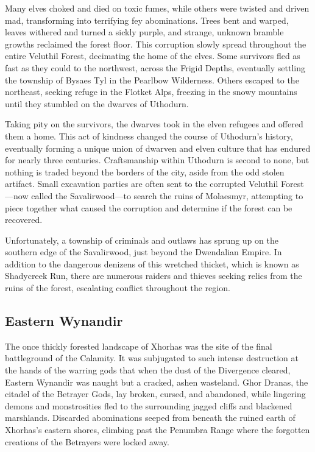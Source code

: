 \documentclass[10pt,a4paper,twoside,bg=print,twocolumn,openany,nodeprecatedcode]{dndbook}
\begin{document}
Many elves choked and died on toxic fumes, while others were twisted and driven mad, transforming into terrifying fey abominations. Trees bent and warped, leaves withered and turned a sickly purple, and strange, unknown bramble growths reclaimed the forest floor. This corruption slowly spread throughout the entire Veluthil Forest, decimating the home of the elves. Some survivors fled as fast as they could to the northwest, across the Frigid Depths, eventually settling the township of Bysaes Tyl in the Pearlbow Wilderness. Others escaped to the northeast, seeking refuge in the Flotket Alps, freezing in the snowy mountains until they stumbled on the dwarves of Uthodurn.

Taking pity on the survivors, the dwarves took in the elven refugees and offered them a home. This act of kindness changed the course of Uthodurn's history, eventually forming a unique union of dwarven and elven culture that has endured for nearly three centuries. Craftsmanship within Uthodurn is second to none, but nothing is traded beyond the borders of the city, aside from the odd stolen artifact. Small excavation parties are often sent to the corrupted Veluthil Forest—now called the Savalirwood—to search the ruins of Molaesmyr, attempting to piece together what caused the corruption and determine if the forest can be recovered.

Unfortunately, a township of criminals and outlaws has sprung up on the southern edge of the Savalirwood, just beyond the Dwendalian Empire. In addition to the dangerous denizens of this wretched thicket, which is known as Shadycreek Run, there are numerous raiders and thieves seeking relics from the ruins of the forest, escalating conflict throughout the region.

\subsection{Eastern Wynandir}
The once thickly forested landscape of Xhorhas was the site of the final battleground of the Calamity. It was subjugated to such intense destruction at the hands of the warring gods that when the dust of the Divergence cleared, Eastern Wynandir was naught but a cracked, ashen wasteland. Ghor Dranas, the citadel of the Betrayer Gods, lay broken, cursed, and abandoned, while lingering demons and monstrosities fled to the surrounding jagged cliffs and blackened marshlands. Discarded abominations seeped from beneath the ruined earth of Xhorhas's eastern shores, climbing past the Penumbra Range where the forgotten creations of the Betrayers were locked away.
\end{document}
